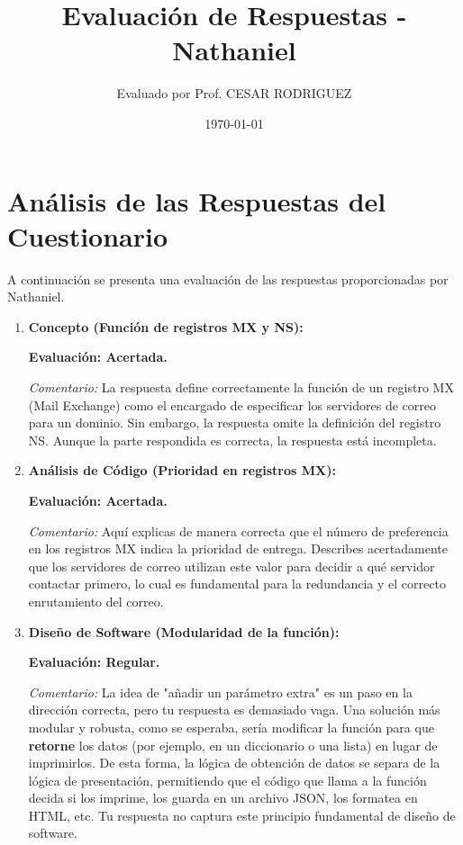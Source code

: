 \documentclass{article}
\title{Evaluación de Respuestas - Nathaniel}
\author{Evaluado por Prof. CESAR RODRIGUEZ}
\date{\today}
\begin{document}
\maketitle

\section*{Análisis de las Respuestas del Cuestionario}

A continuación se presenta una evaluación de las respuestas proporcionadas por Nathaniel.

\begin{enumerate}
    \item \textbf{Concepto (Función de registros MX y NS):}
    
    \textbf{Evaluación: Acertada.}
    
    \textit{Comentario:} La respuesta define correctamente la función de un registro MX (Mail 
    Exchange) como el encargado de especificar los servidores de correo para un dominio. 
    Sin embargo, la respuesta omite la definición del registro NS. Aunque la parte respondida es 
    correcta, la respuesta está incompleta.

    \item \textbf{Análisis de Código (Prioridad en registros MX):}
    
    \textbf{Evaluación: Acertada.}
    
    \textit{Comentario:} Aquí explicas de manera correcta que el número de preferencia en los 
    registros MX indica la prioridad de entrega. Describes acertadamente que los servidores de 
    correo utilizan este valor para decidir a qué servidor contactar primero, lo cual es 
    fundamental para la redundancia y el correcto enrutamiento del correo.

    \item \textbf{Diseño de Software (Modularidad de la función):}
    
    \textbf{Evaluación: Regular.}
    
    \textit{Comentario:} La idea de "añadir un parámetro extra" es un paso en la dirección 
    correcta, pero tu respuesta es demasiado vaga. Una solución más modular y robusta, como se 
    esperaba, sería modificar la función para que \textbf{retorne} los datos (por ejemplo, en un 
    diccionario o una lista) en lugar de imprimirlos. De esta forma, la lógica de obtención de 
    datos se separa de la lógica de presentación, permitiendo que el código que llama a la función 
    decida si los imprime, los guarda en un archivo JSON, los formatea en HTML, etc. Tu respuesta 
    no captura este principio fundamental de diseño de software.

\end{enumerate}
\end{document}
